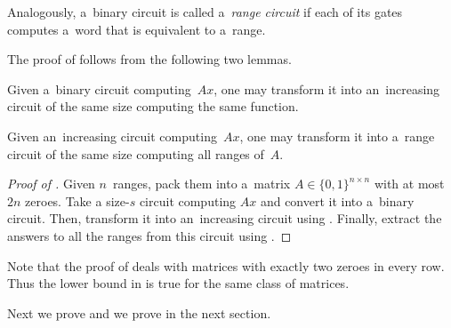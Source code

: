 Analogously, a~binary circuit is called a~\emph{range circuit} if each of its gates computes a~word that is equivalent to a~range.

The proof of  follows from the following two lemmas.

\begin{lemma}\label{lemma:correctorder}
    Given a~binary circuit computing~$Ax$, one may transform it into an~increasing circuit of the same size computing the same function.
\end{lemma}

\begin{lemma}\label{lemma:matrixranges}
    Given an~increasing circuit computing~$Ax$, one may transform it into a~range circuit of the same size computing all ranges of~$A$.
\end{lemma}

\begin{proof}[Proof of {}]
    Given $n$~ranges, pack them into a~matrix $A \in \{0,1\}^{n \times n}$ with at most $2n$ zeroes. Take a size-$s$ circuit computing $Ax$ and convert it into a~binary circuit. Then, transform it into an~increasing circuit using . Finally, extract the answers to all the ranges from this circuit using .
\end{proof}

Note that the proof of  deals with matrices with exactly two zeroes in every row. Thus the lower bound in  is true for the same class of matrices.
%
%
%

Next we prove  and we prove  in the next section.

